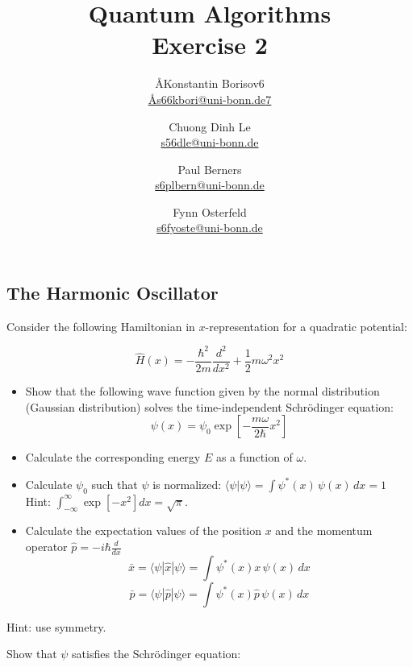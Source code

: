 \documentclass{article}
\title{Quantum Algorithms \\ Exercise 2}
\author{
  \AA{Konstantin Borisov}{6} \\ \href{mailto:\AA{s66kbori@uni-bonn.de}{7}}{\AA{s66kbori@uni-bonn.de}{7}} \and
  Chuong Dinh Le \\ \href{mailto:s56dle@uni-bonn.de}{s56dle@uni-bonn.de} \and
  Paul Berners \\ \href{mailto:s6plbern@uni-bonn.de}{s6plbern@uni-bonn.de} \and
  Fynn Osterfeld \\ \href{mailto:s6fyoste@uni-bonn.de}{s6fyoste@uni-bonn.de}
}
\begin{document}
  \maketitle

  \setcounter{section}{2}
  \subsection{The Harmonic Oscillator}
  \begin{centerframebox}
    Consider the following Hamiltonian in $x$-representation for a quadratic potential:

    \[ \hat{H}(x) = -\frac{\hbar^{2}}{2m}\frac{d^{2}}{d x^{2}}+\frac{1}{2}m\omega^{2}x^{2} \]

    \begin{itemize}
      \item Show that the following wave function given by the normal distribution (Gaussian distribution) solves the time-independent Schrödinger equation:
      \[ \psi(x) = \psi_0\exp\left[-\frac{m\omega}{2\hbar}x^{2}\right] \]
      \item Calculate the corresponding energy $E$ as a function of $\omega$.
      \item Calculate $\psi_0$ such that $\psi$ is normalized: $\langle\psi|\psi\rangle = \int\psi^{*}(x)\,\psi(x)\, dx = 1$ \\
      Hint: ${\int}_{-\infty}^{\infty}\exp[-x^{2}] dx = {\sqrt{\pi}}$.
      \item Calculate the expectation values of the position $x$ and the momentum operator $\hat{p} = -i\hbar \frac{d}{d x}$
      \[ \bar{x} = \langle\psi|\hat{x}|\psi\rangle = \int\psi^{*}(x) x\, \psi(x)\, dx \]
      \[ \bar{p} = \langle\psi|\hat{p}|\psi\rangle = \int\psi^{*}(x) \hat{p}\, \psi(x)\, dx \]
    \end{itemize}

    Hint: use symmetry.
  \end{centerframebox}
  Show that $\psi$ satisfies the Schrödinger equation:
\end{document}
